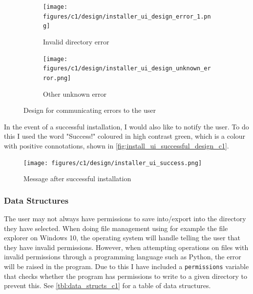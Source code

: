 \documentclass[11pt]{article}
\begin{document}
                \begin{figure}[!ht]
                    \begin{subfigure}{.5\textwidth}
                        \centering
                        \texttt{[image: figures/c1/design/installer\_ui\_design\_error\_1.png]}
                        \caption{Invalid directory error}
                        \label{fig:installer_ui_design_directory_error}
                    \end{subfigure}%
                    \begin{subfigure}{.5\textwidth}
                        \centering
                        \texttt{[image: figures/c1/design/installer\_ui\_design\_unknown\_error.png]}
                        \caption{Other unknown error}
                        \label{fig:installer_ui_design_other_error}
                    \end{subfigure}%
                    \caption{Design for communicating errors to the user}
                    \label{fig:installer_ui_design_errors_c1}
                \end{figure}

                In the event of a successful installation, I would also like to notify the user. To do this I used the word "Success!" coloured in high contrast green, which is a colour with positive connotations, shown in \autoref{fig:install_ui_successful_design_c1}.

                \begin{figure}[!ht]
                    \centering
                    \texttt{[image: figures/c1/design/installer\_ui\_success.png]}
                    \caption{Message after successful installation}
                    \label{fig:install_ui_successful_design_c1}
                \end{figure}


            \subsubsection{Data Structures}

                The user may not always have permissions to save into/export into the directory they have selected. When doing file management using for example the file explorer on Windows 10, the operating system will handle telling the user that they have invalid permissions. However, when attempting operations on files with invalid permissions through a programming language such as Python, the error will be raised in the program. Due to this I have included a \verb|permissions| variable that checks whether the program has permissions to write to a given directory to prevent this. See \autoref{tbl:data_structs_c1} for a table of data structures.
\end{document}
